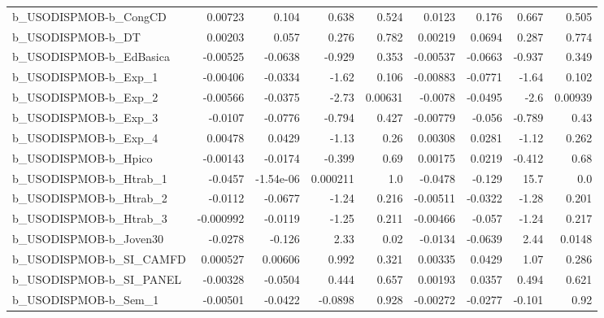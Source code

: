 \begin{tabular}{lrrrrrrrr}
b\_USODISPMOB-b\_CongCD      &     0.00723 &        0.104 &     0.638 &    0.524 &     0.0123 &       0.176 &        0.667 &         0.505 \\
b\_USODISPMOB-b\_DT          &     0.00203 &        0.057 &     0.276 &    0.782 &    0.00219 &      0.0694 &        0.287 &         0.774 \\
b\_USODISPMOB-b\_EdBasica    &    -0.00525 &      -0.0638 &    -0.929 &    0.353 &   -0.00537 &     -0.0663 &       -0.937 &         0.349 \\
b\_USODISPMOB-b\_Exp\_1       &    -0.00406 &      -0.0334 &     -1.62 &    0.106 &   -0.00883 &     -0.0771 &        -1.64 &         0.102 \\
b\_USODISPMOB-b\_Exp\_2       &    -0.00566 &      -0.0375 &     -2.73 &  0.00631 &    -0.0078 &     -0.0495 &         -2.6 &       0.00939 \\
b\_USODISPMOB-b\_Exp\_3       &     -0.0107 &      -0.0776 &    -0.794 &    0.427 &   -0.00779 &      -0.056 &       -0.789 &          0.43 \\
b\_USODISPMOB-b\_Exp\_4       &     0.00478 &       0.0429 &     -1.13 &     0.26 &    0.00308 &      0.0281 &        -1.12 &         0.262 \\
b\_USODISPMOB-b\_Hpico       &    -0.00143 &      -0.0174 &    -0.399 &     0.69 &    0.00175 &      0.0219 &       -0.412 &          0.68 \\
b\_USODISPMOB-b\_Htrab\_1     &     -0.0457 &    -1.54e-06 &  0.000211 &      1.0 &    -0.0478 &      -0.129 &         15.7 &           0.0 \\
b\_USODISPMOB-b\_Htrab\_2     &     -0.0112 &      -0.0677 &     -1.24 &    0.216 &   -0.00511 &     -0.0322 &        -1.28 &         0.201 \\
b\_USODISPMOB-b\_Htrab\_3     &   -0.000992 &      -0.0119 &     -1.25 &    0.211 &   -0.00466 &      -0.057 &        -1.24 &         0.217 \\
b\_USODISPMOB-b\_Joven30     &     -0.0278 &       -0.126 &      2.33 &     0.02 &    -0.0134 &     -0.0639 &         2.44 &        0.0148 \\
b\_USODISPMOB-b\_SI\_CAMFD    &    0.000527 &      0.00606 &     0.992 &    0.321 &    0.00335 &      0.0429 &         1.07 &         0.286 \\
b\_USODISPMOB-b\_SI\_PANEL    &    -0.00328 &      -0.0504 &     0.444 &    0.657 &    0.00193 &      0.0357 &        0.494 &         0.621 \\
b\_USODISPMOB-b\_Sem\_1       &    -0.00501 &      -0.0422 &   -0.0898 &    0.928 &   -0.00272 &     -0.0277 &       -0.101 &          0.92 \\

\end{tabular}
